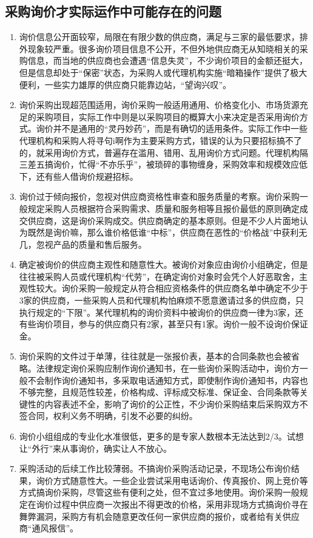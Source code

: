 \subsection {采购询价才实际运作中可能存在的问题}

    \begin{enumerate}
        \item 询价信息公开面较窄，局限在有限少数的供应商，满足与三家的最低要求，排外现象较严重。很多询价项目信息不公开，不但外地供应商无从知晓相关的采购信息，而当地的供应商也会遭遇“信息失灵”，不少询价项目的金额还挺大，但是信息却处于“保密”状态，为采购人或代理机构实施“暗箱操作”提供了极大便利，一些实力雄厚的供应商只能靠边站，“望询兴叹”。

        \item 询价采购出现超范围适用，询价采购一般适用通用、价格变化小、市场货源充足的采购项目，实际工作中则是以采购项目的概算大小来决定是否采用询价方式。询价并不是通用的“灵丹妙药”，而是有确切的适用条件。实际工作中一些代理机构和采购人将寻句i啊作为主要采购方式，错误的认为只要招标搞不了的，就采用询价方式，普遍存在滥用、错用、乱用询价方式问题。代理机构隔三差五搞询价，忙得“不亦乐乎”，被琐碎的事物缠身，采购效率和规模效应低下，还有些人借询价规避招标。

        \item 询价过于倾向报价，忽视对供应商资格性审查和服务质量的考察。询价采购一般规定采购人员根据符合采购需求、质量和服务相等且报价最低的原则确定成交供应商，这是询价采购成交。供应商确定的基本原则。但是不少人片面地认为既然是询价嘛，那么谁价格低谁“中标”，供应商在恶性的“价格战”中获利无几，忽视产品的质量和售后服务。

        \item 确定被询价的供应商主观性和随意性大。被询价对象应由询价小组确定，但是往往被采购人员或代理机构“代劳”，在确定询价对象时会凭个人好恶取舍，主观性较大。询价采购一般规定从符合相应资格条件的供应商名单中确定不少于3家的供应商，一些采购人员和代理机构怕麻烦不愿意邀请过多的供应商，只执行规定的“下限”。某代理机构的询价资料中被询价的供应商一律为3家，还有些询价项目，参与的供应商只有2家，甚至只有1家。询价一般不设询价保证金。

        \item 询价采购的文件过于单薄，往往就是一张报价表，基本的合同条款也会被省略。法律规定询价采购应制作询价通知书，在一些询价采购活动中，询价方一般不会制作询价通知书，多采取电话通知方式，即使制作询价通知书，内容也不够完整，且规范性较差，价格构成、评标成交标准、保证金、合同条款等关键性的内容表述不全，影响了询价的公正性，不少询价采购结束后采购双方不签合同，权利义务不明确，引发不必要的纠纷。

        \item 询价小组组成的专业化水准很低，更多的是专家人数根本无法达到2/3。试想让“外行”来从事询价，确实让人不放心。

        \item 采购活动的后续工作比较薄弱。不搞询价采购活动记录，不现场公布询价结果，询价方式随意性大。一些企业尝试采用电话询价、传真报价、网上竞价等方式搞询价采购，尽管这些有便利之处，但不宜过多地使用。询价采购一般规定在询价过程中供应商一次报出不得更改的价格，采用非现场方式搞询价寻在舞弊漏洞，采购方有机会随意更改任何一家供应商的报价，或者给有关供应商“通风报信”。

    \end{enumerate}
